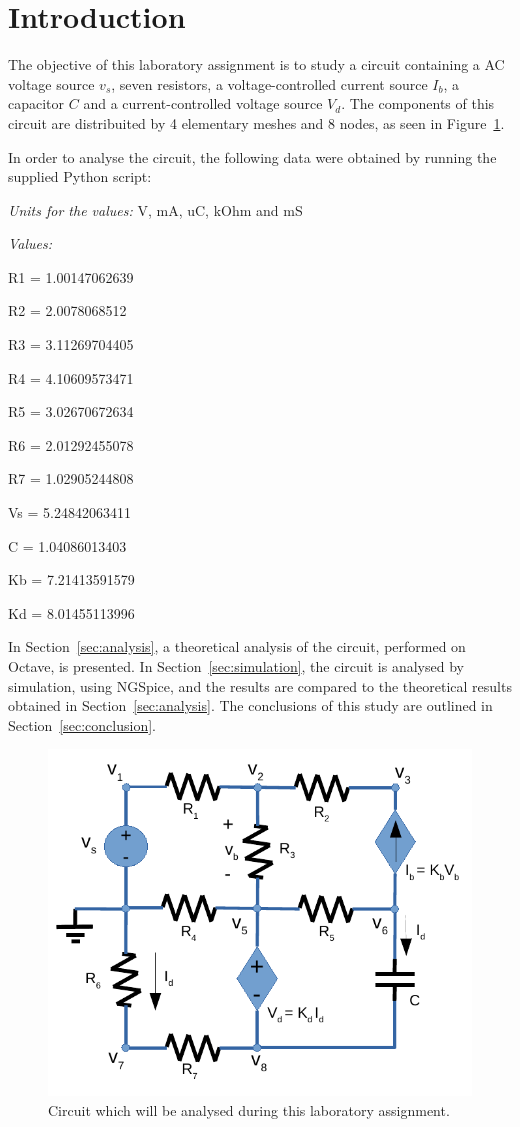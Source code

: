\section{Introduction}
\label{sec:introduction}
The objective of this laboratory assignment is to study a circuit containing a
AC voltage source $v_s$, seven resistors, a voltage-controlled current source $I_b$, a capacitor $C$
and a current-controlled voltage source $V_d$. The components of this circuit are distribuited 
by 4 elementary meshes and 8 nodes, as seen in Figure~\ref{fig:circuit}. 

In order to analyse the circuit, the following data were obtained by running the supplied Python script: 

\textit{Units for the values:} V, mA, uC, kOhm and mS\par
\textit{Values:}


 

R1 = 1.00147062639\par
R2 = 2.0078068512\par
R3 = 3.11269704405\par
R4 = 4.10609573471\par
R5 = 3.02670672634\par
R6 = 2.01292455078\par
R7 = 1.02905244808\par
Vs = 5.24842063411\par
C = 1.04086013403\par
Kb = 7.21413591579\par
Kd = 8.01455113996


In Section~\ref{sec:analysis}, a theoretical analysis of the circuit, 
performed on Octave, is presented. In Section~\ref{sec:simulation}, the 
circuit is analysed by simulation, using NGSpice, and the results are compared to 
the theoretical results obtained in Section~\ref{sec:analysis}. The conclusions 
of this study are outlined in Section~\ref{sec:conclusion}.

\begin{figure}[H] \centering
\includegraphics[width=0.4\linewidth]{circuit.pdf}
\caption{Circuit which will be analysed during this laboratory assignment.}
\label{fig:circuit}
\end{figure}

